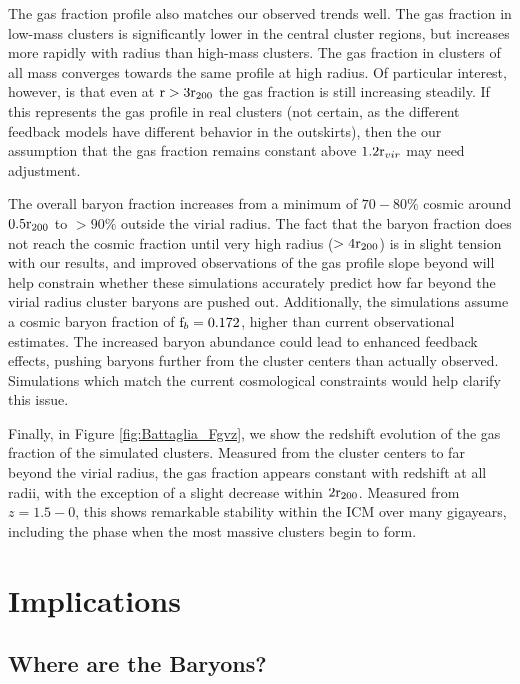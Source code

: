 The gas fraction profile also matches our observed trends well. The
gas fraction in low-mass clusters is significantly lower in the
central cluster regions, but increases more rapidly with radius than
high-mass clusters. The gas fraction in clusters of all mass converges
towards the same profile at high radius. Of particular interest,
however, is that even at $\textrm{r}{}>3\textrm{r\ensuremath{_{200}}}{}$ the gas fraction is
still increasing steadily. If this represents the gas profile in real
clusters (not certain, as the different feedback models have different
behavior in the outskirts), then the our assumption that the gas
fraction remains constant above $1.2\textrm{r\ensuremath{_{vir}}}{}$ may need adjustment. 

The overall baryon fraction increases from a minimum of $70-80\%$
cosmic around $0.5\textrm{r\ensuremath{_{200}}}{}$ to $>90\%$ outside the virial radius. The
fact that the baryon fraction does not reach the cosmic fraction until
very high radius ($>4\textrm{r\ensuremath{_{200}}}{}$) is in slight tension with our results,
and improved observations of the gas profile slope beyond \rtwo{} will
help constrain whether these simulations accurately predict how far
beyond the virial radius cluster baryons are pushed out. Additionally,
the simulations assume a cosmic baryon fraction of $\textrm{f\ensuremath{_b}}{} = 0.172$,
higher than current observational estimates. The increased baryon
abundance could lead to enhanced feedback effects, pushing baryons
further from the cluster centers than actually observed. Simulations
which match the current cosmological constraints would help clarify
this issue. 



Finally, in Figure \ref{fig:Battaglia_Fgvz}, we show the redshift
evolution of the gas fraction of the \citet{Battaglia2013} simulated
clusters. Measured from the cluster centers to far beyond the virial
radius, the gas fraction appears constant with redshift at all radii,
with the exception of a slight decrease within $2\textrm{r\ensuremath{_{200}}}$. Measured from
$z=1.5-0$, this shows remarkable stability within the ICM over many
gigayears, including the phase when the most massive clusters begin to
form. 

\section{Implications}
\label{sec:Implications}

\subsection{Where are the Baryons?}
\label{sec:Implications.Where}

